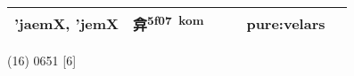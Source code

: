 \documentclass[14pt,a4paper]{scrartcl}
\begin{document}
\begin{longtable}[c]{@{}llllll@{}}
\begin{minipage}[t]{0.14\columnwidth}
'jaemX, 'jemX
\strut\end{minipage} &
\begin{minipage}[t]{0.14\columnwidth}\raggedright\strut
弇\textsuperscript{5f07~kom}
\strut\end{minipage} &
\begin{minipage}[t]{0.14\columnwidth}\raggedright\strut
\strut\end{minipage} &
\begin{minipage}[t]{0.14\columnwidth}\raggedright\strut
\strut\end{minipage} &
\begin{minipage}[t]{0.14\columnwidth}\raggedright\strut
pure:velars
\strut\end{minipage}\tabularnewline
\bottomrule
\end{longtable}

(16) 0651 {[}6{]}
\end{document}
